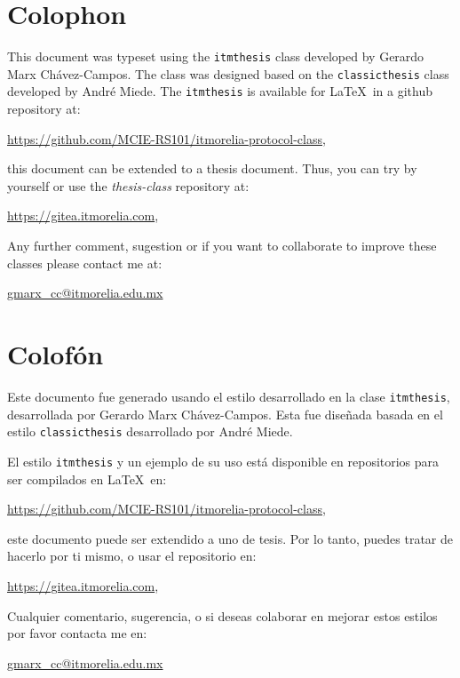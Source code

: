 
\pagestyle{empty}
\hfill
\vfill
{}
\section*{Colophon}

This document was typeset using the  \texttt{itmthesis} class developed by Gerardo Marx Chávez-Campos. The class was designed based on the \texttt{classicthesis} class developed by Andr\'e Miede. The \texttt{itmthesis} is available for \LaTeX\ in a github repository at: 

\begin{center}
\url{https://github.com/MCIE-RS101/itmorelia-protocol-class}, 
\end{center}

this document can be extended to a thesis document. Thus, you can try by yourself or use the \textit{thesis-class} repository at:

\begin{center}
\url{https://gitea.itmorelia.com}, 
\end{center}

\noindent Any further comment, sugestion or if you want to collaborate to improve these  classes please contact me at:

\href{mailto:gmarx\_cc@itmorelia.edu.mx}{gmarx\_cc@itmorelia.edu.mx} 

\section*{Colofón}

Este documento fue generado usando el estilo desarrollado en la clase \texttt{itmthesis}, desarrollada por Gerardo Marx Chávez-Campos. Esta  fue diseñada basada en el estilo \texttt{classicthesis} desarrollado por Andr\'e Miede. 

El estilo \texttt{itmthesis} y un ejemplo de su uso está disponible en repositorios para ser compilados en \LaTeX\ en: 

\begin{center}
\url{https://github.com/MCIE-RS101/itmorelia-protocol-class}, 
\end{center}
este documento puede ser extendido a uno de tesis. Por lo tanto, puedes tratar de hacerlo por ti mismo, o usar el repositorio en:

\begin{center}
\url{https://gitea.itmorelia.com}, 
\end{center}

\noindent Cualquier comentario, sugerencia, o si deseas colaborar en mejorar estos estilos por favor contacta me en:

\href{mailto:gmarx\_cc@itmorelia.edu.mx}{gmarx\_cc@itmorelia.edu.mx} 